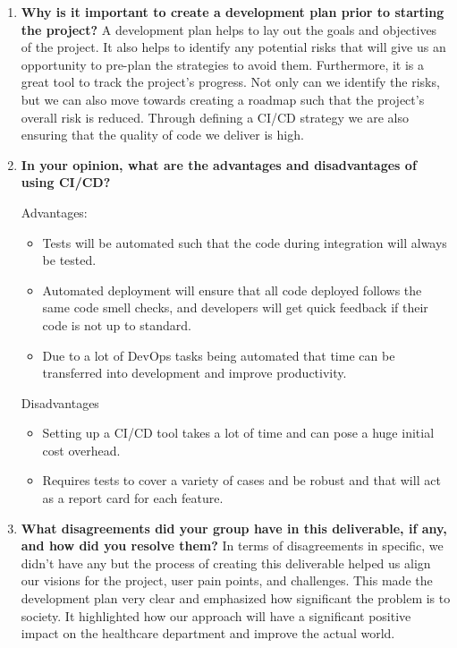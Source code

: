 \documentclass{article}
\begin{document}



\begin{enumerate}
    \item \textbf{Why is it important to create a development plan prior to starting the project?}
    A development plan helps to lay out the goals and objectives of the project. It also helps to identify any potential risks that will give us an opportunity to pre-plan the strategies to avoid them. Furthermore, it is a great tool to track the project’s progress.
    Not only can we identify the risks, but we can also move towards creating a roadmap such that the project’s overall risk is reduced. Through defining a CI/CD strategy we are also ensuring that the quality of code we deliver is high. 

    \item \textbf{In your opinion, what are the advantages and disadvantages of using CI/CD?}

    Advantages:
    \begin{itemize}
    \item Tests will be automated such that the code during integration will always be tested.   
    \item Automated deployment will ensure that all code deployed follows the same code smell checks, and developers will get quick feedback if their code is not up to standard.
    \item Due to a lot of DevOps tasks being automated that time can be transferred into development and improve productivity.
    \end{itemize}

    Disadvantages
    \begin{itemize}
    \item Setting up a CI/CD tool takes a lot of time and can pose a huge initial cost overhead.  
    \item Requires tests to cover a variety of cases and be robust and that will act as a report card for each feature.
    \end{itemize}

    \item \textbf{What disagreements did your group have in this deliverable, if any, and how did you resolve them?}
    In terms of disagreements in specific, we didn’t have any but the process of creating this deliverable helped us align our visions for the project, user pain points, and challenges. This made the development plan very clear and emphasized how significant the problem is to society. It highlighted how our approach will have a significant positive impact on the healthcare department and improve the actual world.

\end{enumerate}
\end{document}
